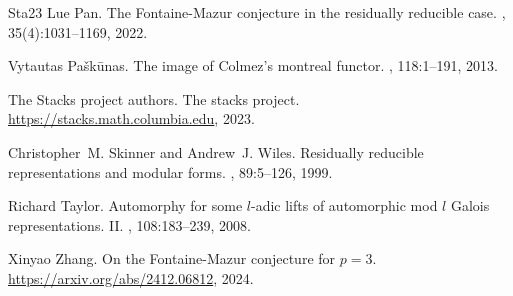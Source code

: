 \documentclass[12pt]{amsart}
\theoremstyle{plain}
\theoremstyle{definition}
\theoremstyle{remark}
\begin{document}
\begin{thebibliography}{{Sta}23}
Lue Pan.
\newblock The {Fontaine-Mazur} conjecture in the residually reducible case.
, 35(4):1031--1169,
  2022.

Vytautas Pa{\v{s}}k{\=u}nas.
\newblock The image of {Colmez's} montreal functor.
, 118:1--191, 2013.

The {Stacks project authors}.
\newblock The stacks project.
\newblock \url{https://stacks.math.columbia.edu}, 2023.

Christopher~M. Skinner and Andrew~J. Wiles.
\newblock Residually reducible representations and modular forms.
, 89:5--126, 1999.

Richard Taylor.
\newblock Automorphy for some $l$-adic lifts of automorphic mod $l$ {Galois}
  representations. {II}.
, 108:183--239, 2008.

Xinyao Zhang.
\newblock On the {F}ontaine-{M}azur conjecture for $p=3$.
\newblock \url{https://arxiv.org/abs/2412.06812}, 2024.

\end{thebibliography}
\end{document}
